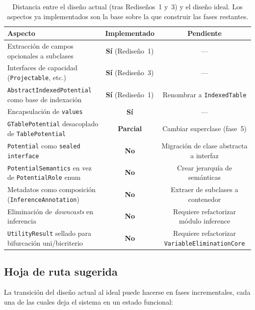 \documentclass[11pt,a4paper]{article}
\newcommand{\code}[1]{\texttt{#1}}
\newcommand{\bad}[1]{\textcolor{codered}{\textbf{#1}}}
\newcommand{\good}[1]{\textcolor{codegreen}{\textbf{#1}}}
\newcommand{\warn}[1]{\textcolor{warnorange}{\textbf{#1}}}
\begin{document}
\begin{table}[H]
\centering
\small
\begin{tabular}{lcc}
\toprule
\textbf{Aspecto} & \textbf{Implementado} & \textbf{Pendiente} \\
\midrule
\rowcolor{lightgray}
Extracción de campos opcionales a subclases & \good{Sí} (Rediseño~1) & --- \\
Interfaces de capacidad (\code{Projectable}, etc.) & \good{Sí} (Rediseño~3) & --- \\
\rowcolor{lightgray}
\code{AbstractIndexedPotential} como base de indexación & \good{Sí} (Rediseño~1) & Renombrar a \code{IndexedTable} \\
Encapsulación de \code{values} & \good{Sí} & --- \\
\rowcolor{lightgray}
\code{GTablePotential} desacoplado de \code{TablePotential} & \warn{Parcial} & Cambiar superclase (fase~5) \\
\code{Potential} como \code{sealed interface} & \bad{No} & Migración de clase abstracta a interfaz \\
\rowcolor{lightgray}
\code{PotentialSemantics} en vez de \code{PotentialRole} enum & \bad{No} & Crear jerarquía de semánticas \\
Metadatos como composición (\code{InferenceAnnotation}) & \bad{No} & Extraer de subclases a contenedor \\
\rowcolor{lightgray}
Eliminación de \emph{downcasts} en inferencia & \bad{No} & Requiere refactorizar módulo inference \\
\code{UtilityResult} sellado para bifurcación uni/bicriterio & \bad{No} & Requiere refactorizar \code{VariableEliminationCore} \\
\bottomrule
\end{tabular}
\caption{Distancia entre el diseño actual (tras Rediseños~1 y~3) y el diseño
         ideal.  Los aspectos ya implementados son la base sobre la que
         construir las fases restantes.}
\label{tab:ideal-distancia}
\end{table}

\subsection{Hoja de ruta sugerida}

La transición del diseño actual al ideal puede hacerse en fases incrementales,
cada una de las cuales deja el sistema en un estado funcional:
\end{document}
